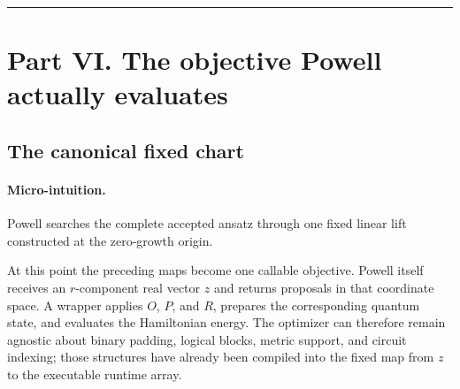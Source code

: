 \documentclass[10pt,twocolumn]{article}
\newcommand{\conceptbreak}{%
  \par\medskip\noindent
  {\color{black!30}\rule{\columnwidth}{0.35pt}}%
  \par\medskip}
\newcommand{\micro}{\paragraph{Micro-intuition.}}
\begin{document}
\begin{center}
\end{center}

\conceptbreak

\section*{Part VI. The objective Powell actually evaluates}

\subsection*{The canonical fixed chart}

\micro Powell searches the complete accepted ansatz through one fixed linear
lift constructed at the zero-growth origin.

At this point the preceding maps become one callable objective. Powell itself
receives an \(r\)-component real vector \(z\) and returns proposals in that
coordinate space. A wrapper applies \(O\), \(P\), and \(R\), prepares the
corresponding quantum state, and evaluates the Hamiltonian energy. The
optimizer can therefore remain agnostic about binary padding, logical blocks,
metric support, and circuit indexing; those structures have already been
compiled into the fixed map from \(z\) to the executable runtime array.
\end{document}
